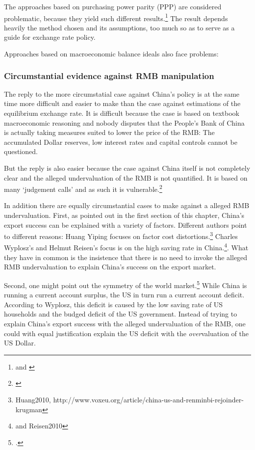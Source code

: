 \documentclass[11pt]{article}
\begin{document}
The approaches based on purchasing power parity (PPP) are considered problematic, because they yield such different results.\footnote{\cite[p. 16]{Yu2010} and \cite[pp. 82]{CheungChinn2010}} The result depends heavily the method chosen and its assumptions, too much so as to serve as a guide for exchange rate policy.

Approaches based on macroeconomic balance ideals also face problems: 



\subsubsection{Circumstantial evidence against RMB manipulation}

The reply to the more circumstatial case against China's policy is at the same time more difficult and easier to make than the case against estimations of the equilibrium exchange rate. It is difficult because the case is based on textbook macroeconomic reasoning and nobody disputes that the People's Bank of China is actually taking measures suited to lower the price of the RMB: The accumulated Dollar reserves, low interest rates and capital controls cannot be questioned.

But the reply is also easier because the case against China itself is not completely clear and the alleged undervaluation of the RMB is not quantified. It is based on many  `judgement calls' and as such it is vulnerable.\footnote{\cite[p. 85]{CheungChinnFujii2010}}

In addition there are equally circumstantial cases to make against a alleged RMB undervaluation. First, as pointed out in the first section of this chapter, China's export success can be explained with a variety of factors.  Different authors point to different reasons: Huang Yiping focuses on factor cost distortions.\footnote{Huang2010, http://www.voxeu.org/article/china-us-and-renminbi-rejoinder-krugman} Charles Wyplosz's and Helmut Reisen's focus is on the high saving rate in China.\footnote{\cite[pp. 40]{Wyplosz2010} and \cite{p. 65}{Reisen2010}}. What they have in common is the insistence that there is no need to invoke the alleged RMB undervaluation to explain China's success on the export market.

Second, one might point out the symmetry of the world market.\footnote{\cite[pp. 39-40]{Wyplosz2010}.} While China is running a current account surplus, the US in turn run a current account deficit. According to Wyplosz, this deficit is caused by the low saving rate of US households and the budged deficit of the US government. Instead of trying to explain China's export success with the alleged undervaluation of the RMB, one could with equal justification explain the US deficit with the \emph{over}valuation of the US Dollar. 
\end{document}
